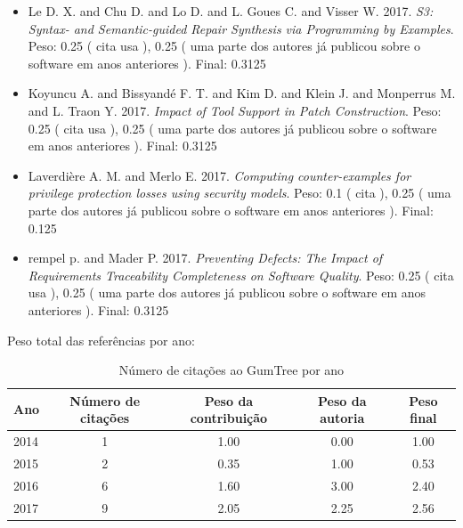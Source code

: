 \begin{itemize}
\item Le D. X. and Chu D. and Lo D. and L. Goues C. and Visser W.
      2017.
        \textit{ S3: Syntax- and Semantic-guided Repair Synthesis via Programming by Examples}.
      Peso:
      0.25 (
          cita
          usa
      ),
      0.25 (
uma parte dos autores já publicou sobre o software em anos anteriores
      ).
      Final:
      0.3125

\item Koyuncu A. and Bissyand{\'e} F. T. and Kim D. and Klein J. and Monperrus M. and L. Traon Y.
      2017.
        \textit{ Impact of Tool Support in Patch Construction}.
      Peso:
      0.25 (
          cita
          usa
      ),
      0.25 (
uma parte dos autores já publicou sobre o software em anos anteriores
      ).
      Final:
      0.3125

\item Laverdière A. M. and Merlo E.
      2017.
        \textit{ Computing counter-examples for privilege protection losses using security models}.
      Peso:
      0.1 (
          cita
      ),
      0.25 (
uma parte dos autores já publicou sobre o software em anos anteriores
      ).
      Final:
      0.125

\item rempel p. and Mader P.
      2017.
        \textit{ Preventing Defects: The Impact of Requirements Traceability Completeness on Software Quality}.
      Peso:
      0.25 (
          cita
          usa
      ),
      0.25 (
uma parte dos autores já publicou sobre o software em anos anteriores
      ).
      Final:
      0.3125

\end{itemize}

Peso total das referências por ano:

\begin{table}[h]
\caption{Número de citações ao GumTree por ano}
\centering
\begin{tabular}{| l | c | c | c | c |}
  \hline
  Ano & Número de citações & Peso da contribuição & Peso da autoria & Peso final \\
  \hline
  2014
    & 1
    & 1.00
    & 0.00
    & 1.00 \\
  2015
    & 2
    & 0.35
    & 1.00
    & 0.53 \\
  2016
    & 6
    & 1.60
    & 3.00
    & 2.40 \\
  2017
    & 9
    & 2.05
    & 2.25
    & 2.56 \\
  \hline
\end{tabular}
\end{table}


